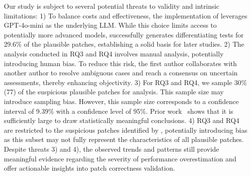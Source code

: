 Our study is subject to several potential threats to validity and intrinsic limitations: 
1) To balance costs and effectiveness, the implementation of \appname leverages GPT-4o-mini as the underlying LLM. 
While this choice limits access to potentially more advanced models, 
\appname successfully generates differentiating tests for 29.6\% of the plausible patches, 
establishing a solid basis for later studies. 
2) The analysis conducted in RQ3 and RQ4 involves manual analysis, potentially introducing human bias. 
To reduce this risk, the first author collaborates with another author to resolve ambiguous cases and reach a consensus on uncertain assessments, thereby enhancing objectivity.
3) For RQ3 and RQ4, we sample 30\% (77) of the suspicious plausible patches for analysis.
This sample size may introduce sampling bias.
However, this sample size corresponds to a confidence interval of 9.39\% with a confidence level of 95\%.
Prior work~\cite{linares2014api,hassan2018studying} shows that it is sufficiently large to draw statistically meaningful conclusions.
4) RQ3 and RQ4 are restricted to the suspicious patches identified by \appname, potentially introducing bias as this subset may not fully represent the characteristics of all plausible patches.
Despite threats 3) and 4), 
the observed trends and patterns still provide meaningful evidence regarding the severity of performance overestimation and offer actionable insights into patch correctness validation. 

\vspace{-0.1cm}




